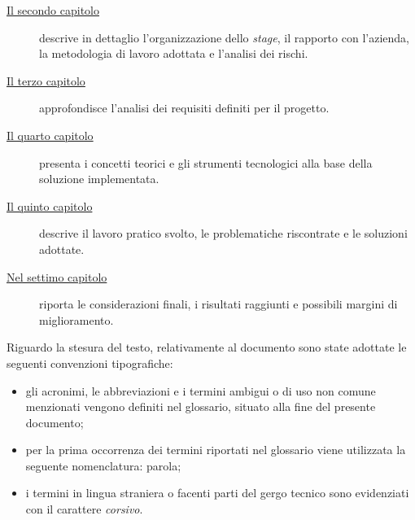 \begin{description}
    \item[{\hyperref[cap:descrizione-stage]{Il secondo capitolo}}] descrive in dettaglio l'organizzazione dello \emph{stage}, il rapporto con l'azienda, la metodologia di lavoro adottata e l'analisi dei rischi.
    
    \item[{\hyperref[cap:analisi-requisiti]{Il terzo capitolo}}] approfondisce l'analisi dei requisiti definiti per il progetto.
    
    \item[{\hyperref[cap:introduzione-teorica]{Il quarto capitolo}}] presenta i concetti teorici e gli strumenti tecnologici alla base della soluzione implementata.
    
    \item[{\hyperref[cap:implementazione-risultati]{Il quinto capitolo}}] descrive il lavoro pratico svolto, le problematiche riscontrate e le soluzioni adottate.
        
    \item[{\hyperref[cap:conclusioni]{Nel settimo capitolo}}] riporta le considerazioni finali, i risultati raggiunti e possibili margini di miglioramento.
\end{description}

Riguardo la stesura del testo, relativamente al documento sono state adottate le seguenti convenzioni tipografiche:
\begin{itemize}
	\item gli acronimi, le abbreviazioni e i termini ambigui o di uso non comune menzionati vengono definiti nel glossario, situato alla fine del presente documento;
	\item per la prima occorrenza dei termini riportati nel glossario viene utilizzata la seguente nomenclatura: parola\glsfirstoccur;
	\item i termini in lingua straniera o facenti parti del gergo tecnico sono evidenziati con il carattere \emph{corsivo}.
\end{itemize}